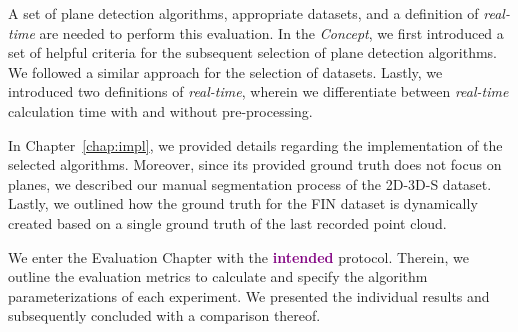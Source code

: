 \documentclass[main.tex]{subfiles}
\begin{document}
A set of plane detection algorithms, appropriate datasets, and a definition of \textit{real-time} are needed to perform this evaluation. In the \textit{Concept}, we first introduced a set of helpful criteria for the subsequent selection of plane detection algorithms. We followed a similar approach for the selection of datasets. Lastly, we introduced two definitions of \textit{real-time}, wherein we differentiate between \textit{real-time} calculation time with and without pre-processing.

In Chapter~\ref{chap:impl}, we provided details regarding the implementation of the selected algorithms. Moreover, since its provided ground truth does not focus on planes, we described our manual segmentation process of the 2D-3D-S dataset. Lastly, we outlined how the ground truth for the FIN dataset is dynamically created based on a single ground truth of the last recorded point cloud.

We enter the Evaluation Chapter with the \textbf{\textcolor{purple}{intended}} protocol. Therein, we outline the evaluation metrics to calculate and specify the algorithm parameterizations of each experiment. We presented the individual results and subsequently concluded with a comparison thereof.
\end{document}
